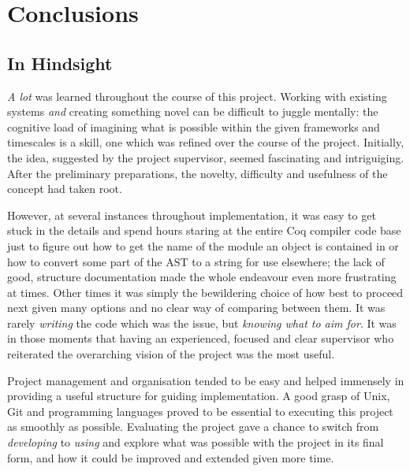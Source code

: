 \chapter{Conclusions}

%

\section{In Hindsight}

\emph{A lot} was learned throughout the course of this project. Working with
existing systems \emph{and} creating something novel can be difficult to juggle
mentally: the cognitive load of imagining what is possible within the given
frameworks and timescales is a skill, one which was refined over the course of
the project. Initially, the idea, suggested by the project supervisor, seemed
fascinating and intriguiging. After the preliminary preparations, the novelty,
difficulty and usefulness of the concept had taken root.

However, at several instances throughout implementation, it was easy to get
stuck in the details and spend hours staring at the entire Coq compiler code
base just to figure out how to get the name of the module an object is contained
in or how to convert some part of the AST to a string for use elsewhere; the
lack of good, structure documentation made the whole endeavour even more
frustrating at times. Other times it was simply the bewildering choice of how
best to proceed next given many options and no clear way of comparing between
them. It was rarely \emph{writing} the code which was the issue, but
\emph{knowing what to aim for}. It was in those moments that having an
experienced, focused and clear supervisor who reiterated the overarching vision
of the project was the most useful.

Project management and organisation tended to be easy and helped immensely in
providing a useful structure for guiding implementation. A good grasp of Unix,
Git and programming languages proved to be essential to executing this project
as smoothly as possible. Evaluating the project gave a chance to switch from
\emph{developing} to \emph{using} and explore what was possible with the project
in its final form, and how it could be improved and extended given more time.

